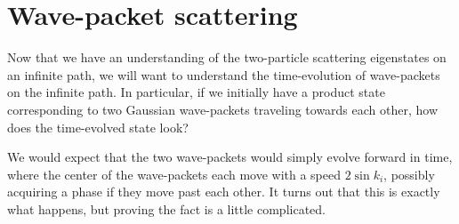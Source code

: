 \documentclass[../thesis-main/thesis-main]{subfiles}
\begin{document}

\section{Wave-packet scattering}

Now that we have an understanding of the two-particle scattering eigenstates on an infinite path, we will want to understand the time-evolution of wave-packets on the infinite path.  In particular, if we initially have a product state corresponding to two Gaussian wave-packets traveling towards each other, how does the time-evolved state look?

We would expect that the two wave-packets would simply evolve forward in time, where the center of the wave-packets each move with a speed $2\sin k_i$, possibly acquiring a phase if they move past each other.  It turns out that this is exactly what happens, but proving the fact is a little complicated. 

\end{document}
